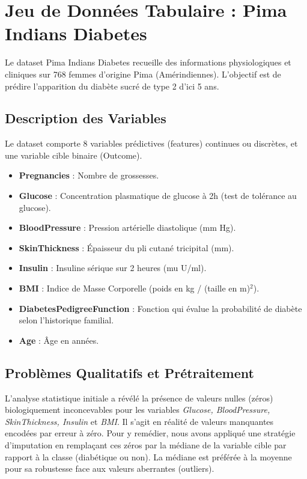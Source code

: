 \documentclass[a4paper,12pt]{report}
\begin{document}
\section{Jeu de Données Tabulaire : Pima Indians Diabetes}
Le dataset Pima Indians Diabetes recueille des informations physiologiques et cliniques sur 768 femmes d'origine Pima (Amérindiennes). L'objectif est de prédire l'apparition du diabète sucré de type 2 d'ici 5 ans.

\subsection{Description des Variables}
Le dataset comporte 8 variables prédictives (features) continues ou discrètes, et une variable cible binaire (Outcome).
\begin{itemize}
    \item \textbf{Pregnancies} : Nombre de grossesses.
    \item \textbf{Glucose} : Concentration plasmatique de glucose à 2h (test de tolérance au glucose).
    \item \textbf{BloodPressure} : Pression artérielle diastolique (mm Hg).
    \item \textbf{SkinThickness} : Épaisseur du pli cutané tricipital (mm).
    \item \textbf{Insulin} : Insuline sérique sur 2 heures (mu U/ml).
    \item \textbf{BMI} : Indice de Masse Corporelle (poids en kg / (taille en m)$^2$).
    \item \textbf{DiabetesPedigreeFunction} : Fonction qui évalue la probabilité de diabète selon l'historique familial.
    \item \textbf{Age} : Âge en années.
\end{itemize}

\subsection{Problèmes Qualitatifs et Prétraitement}
L'analyse statistique initiale a révélé la présence de valeurs nulles (zéros) biologiquement inconcevables pour les variables \textit{Glucose, BloodPressure, SkinThickness, Insulin} et \textit{BMI}. Il s'agit en réalité de valeurs manquantes encodées par erreur à zéro.
Pour y remédier, nous avons appliqué une stratégie d'imputation en remplaçant ces zéros par la médiane de la variable cible par rapport à la classe (diabétique ou non). La médiane est préférée à la moyenne pour sa robustesse face aux valeurs aberrantes (outliers).
\end{document}
